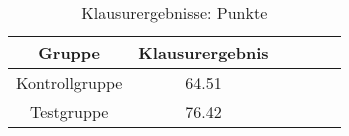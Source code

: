 \begin{table}
\centering
\caption{Klausurergebnisse: Punkte}
\begin{tabular}{cccccc}
\toprule
        Gruppe &  Klausurergebnis \\
\midrule
Kontrollgruppe &            64.51 \\
    Testgruppe &            76.42 \\
\bottomrule
\end{tabular}
\end{table}
